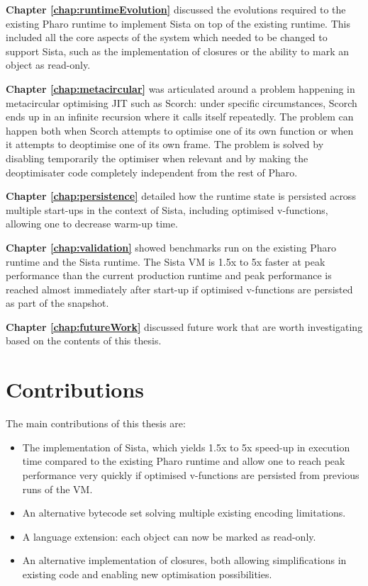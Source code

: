 \documentclass[a4paper,12pt,twoside]{../includes/ThesisStyle}
\begin{document}
\textbf{Chapter \ref{chap:runtimeEvolution}} discussed the evolutions required to the existing Pharo runtime to implement Sista on top of the existing runtime. This included all the core aspects of the system which needed to be changed to support Sista, such as the implementation of closures or the ability to mark an object as read-only.

\textbf{Chapter \ref{chap:metacircular}} was articulated around a problem happening in metacircular optimising JIT such as Scorch: under specific circumstances, Scorch ends up in an infinite recursion where it calls itself repeatedly. The problem can happen both when Scorch attempts to optimise one of its own function or when it attempts to deoptimise one of its own frame. The problem is solved by disabling temporarily the optimiser when relevant and by making the deoptimisater code completely independent from the rest of Pharo.

\textbf{Chapter \ref{chap:persistence}} detailed how the runtime state is persisted across multiple start-ups in the context of Sista, including optimised v-functions, allowing one to decrease warm-up time. 

\textbf{Chapter \ref{chap:validation}} showed benchmarks run on the existing Pharo runtime and the Sista runtime. The Sista VM is 1.5x to 5x faster at peak performance than the current production runtime and peak performance is reached almost immediately after start-up if optimised v-functions are persisted as part of the snapshot.

\textbf{Chapter \ref{chap:futureWork}} discussed future work that are worth investigating based on the contents of this thesis.

\section{Contributions}

The main contributions of this thesis are:
\begin{itemize}
	\item The implementation of Sista, which yields 1.5x to 5x speed-up in execution time compared to the existing Pharo runtime and allow one to reach peak performance very quickly if optimised v-functions are persisted from previous runs of the VM.
	\item An alternative bytecode set solving multiple existing encoding limitations.
	\item A language extension: each object can now be marked as read-only.
	\item An alternative implementation of closures, both allowing simplifications in existing code and enabling new optimisation possibilities.
\end{itemize}
\end{document}
